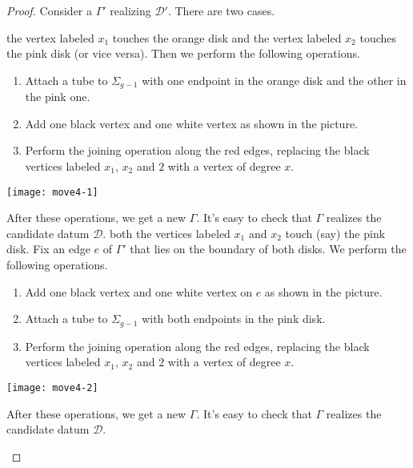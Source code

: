 \documentclass{article}
\begin{document}
\begin{proof}
Consider a \dessin{} $\Gamma'$ realizing $\mathcal{D}'$. There are two cases.
\begin{manycases}

\case the vertex labeled $x_1$ touches the orange disk and the vertex labeled $x_2$ touches the pink disk (or vice versa). Then we perform the following operations.
\begin{enumerate}
\item Attach a tube to $\Sigma_{g-1}$ with one endpoint in the orange disk and the other in the pink one.
\item Add one black vertex and one white vertex as shown in the picture.
\item Perform the joining operation along the red edges, replacing the black vertices labeled $x_1$, $x_2$ and $2$ with a vertex of degree $x$.
\end{enumerate}
\begin{center}
\texttt{[image: move4-1]}
\end{center}
After these operations, we get a new \dessin{} $\Gamma$. It's easy to check that $\Gamma$ realizes the candidate datum $\mathcal{D}$.
\case both the vertices labeled $x_1$ and $x_2$ touch (say) the pink disk. Fix an edge $e$ of $\Gamma'$ that lies on the boundary of both disks. We perform the following operations.
\begin{enumerate}
\item Add one black vertex and one white vertex on $e$ as shown in the picture.
\item Attach a tube to $\Sigma_{g-1}$ with both endpoints in the pink disk.
\item Perform the joining operation along the red edges, replacing the black vertices labeled $x_1$, $x_2$ and $2$ with a vertex of degree $x$.
\end{enumerate}
\begin{center}
\texttt{[image: move4-2]}
\end{center}
After these operations, we get a new \dessin{} $\Gamma$. It's easy to check that $\Gamma$ realizes the candidate datum $\mathcal{D}$.\qedhere
\end{manycases}
\end{proof}
\end{document}
